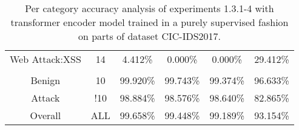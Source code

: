 \begin{table}[htb]
{\begin{tabular}{@{}cccccc@{}}
        Web Attack:XSS &  14 &  4.412\% &  0.000\% &  0.000\% &  29.412\% \\
         \\
        Benign &  10 &  99.920\% &  99.743\% &  99.374\% &  96.633\% \\
        Attack &  !10 &  98.884\% &  98.576\% &  98.640\% &  82.865\% \\
        Overall &  ALL &  99.658\% &  99.448\% &  99.189\% &  93.154\% \\
        \bottomrule
    \end{tabular}}
    \caption{Per category accuracy analysis of experiments 1.3.1-4 with transformer encoder model trained in a purely supervised fashion on parts of dataset CIC-IDS2017.}
    \label{table:results:lstm:class_flows_supervised}
\end{table}